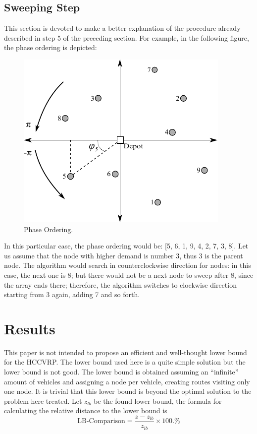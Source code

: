 \documentclass[10pt,twoside]{article}
\begin{document}
\subsection{Sweeping Step}
This section is devoted to make a better explanation of the procedure already described in step 5 of the preceding section. For example, in the following figure, the phase ordering is depicted:
\begin{figure}[H]
    \centering
    \includegraphics[scale=1.4]{figs/drawing.pdf}
    \caption{Phase Ordering.}
    \label{fig:phase_order}
\end{figure}
In this particular case, the phase ordering would be: [5, 6, 1, 9, 4, 2, 7, 3, 8]. Let us assume that the node with higher demand is number 3, thus 3 is the parent node. The algorithm would search in counterclockwise direction for nodes: in this case, the next one is 8; but there would not be a next node to sweep after 8, since the array ends there; therefore, the algorithm switches to clockwise direction starting from 3 again, adding 7 and so forth. 

\section{Results}
This paper is not intended to propose an efficient and well-thought lower bound for the HCCVRP. The lower bound used here is a quite simple solution but the lower bound is not good. The lower bound is obtained assuming an ``infinite'' amount of vehicles and assigning a node per vehicle, creating routes visiting only one node. It is trivial that this lower bound is beyond the optimal solution to the problem here treated. Let $z_{lb}$ be the found lower bound, the formula for calculating the relative distance to the lower bound is
\[\text{LB-Comparison}=\dfrac{z-z_{lb}}{z_{lb}}\times100.\%\]
\end{document}
